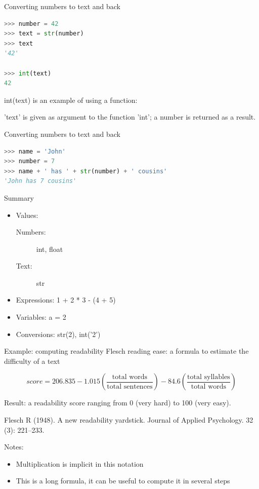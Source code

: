 \documentclass{beamer}
\begin{document}
\begin{frame}[fragile]{Converting numbers to text and back}
\begin{lstlisting}[language=python]
>>> number = 42
>>> text = str(number)
>>> text
'42'

>>> int(text)
42
\end{lstlisting}

    int(text) is an example of using a function:

    'text' is given as argument to the function 'int';
    a number is returned as a result.
\end{frame}


\begin{frame}[fragile]{Converting numbers to text and back}
\begin{lstlisting}[language=python]
>>> name = 'John'
>>> number = 7
>>> name + ' has ' + str(number) + ' cousins'
'John has 7 cousins'
\end{lstlisting}
\end{frame}

\begin{frame}{Summary}
    \begin{itemize}
        \item Values:
            \begin{description}
                \item[Numbers:] int, float
                \item[Text:] str
            \end{description}
        \item Expressions: 1 + 2 * 3 - (4 + 5)
        \item Variables: a = 2
        \item Conversions: str(2), int('2')
    \end{itemize}
\end{frame}

\begin{frame}{Example: computing readability}
    Flesch reading ease: a formula to estimate the difficulty of a text

    \[
        score = 206.835 - 1.015 ( \frac{\textrm{total words}}{\textrm{total sentences}} )
            - 84.6 ( \frac{\textrm{total syllables}}{\textrm{total words}} )
    \]

    Result: a readability score ranging from 0 (very hard) to 100 (very easy).

    \vspace{1em}
    Flesch R (1948). A new readability yardstick. Journal of Applied Psychology. 32 (3): 221–233.

    \pause
    Notes:
    \begin{itemize}
        \item Multiplication is implicit in this notation
        \item This is a long formula, it can be useful to compute
            it in several steps %
    \end{itemize}
\end{frame}
\end{document}
